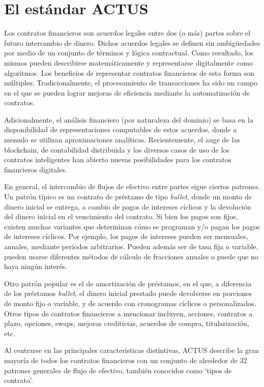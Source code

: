 \documentclass[12pt]{book}
\begin{document}
\section{El estándar ACTUS}
Los contratos financieros son acuerdos legales entre dos (o más) partes sobre el futuro intercambio de dinero. Dichos acuerdos legales se definen sin ambigüedades por medio de un conjunto de términos y lógica contractual. Como resultado, los mismos pueden describirse matemáticamente y representarse digitalmente como algoritmos. Los beneficios de representar contratos financieros de esta forma son múltiples; Tradicionalmente, el procesamiento de transacciones ha sido un campo en el que se pueden lograr mejoras de eficiencia mediante la automatización de contratos.

Adicionalmente, el análisis financiero (por naturaleza del dominio) se basa en la disponibilidad de representaciones computables de estos acuerdos, donde a menudo se utilizan aproximaciones analíticas. Recientemente, el auge de las blockchain, de contabilidad distribuida y los diversos casos de uso de los contratos inteligentes han abierto nuevas posibilidades para los contratos financieros digitales.

En general, el intercambio de flujos de efectivo entre partes sigue ciertos patrones. Un patrón típico es un contrato de préstamo de tipo \textit{bullet}, donde un monto de dinero inicial se entrega, a cambio de pagos de intereses cíclicos y la devolución del dinero inicial en el vencimiento del contrato. Si bien los pagos son fijos, existen muchas variantes que determinan cómo se programan y/o pagan los pagos de intereses cíclicos. Por ejemplo, los pagos de intereses pueden ser mensuales, anuales, mediante períodos arbitrarios. Pueden además ser de tasa fija o variable, pueden usarse diferentes métodos de cálculo de fracciones anuales o puede que no haya ningún interés.

Otro patrón popular es el de amortización de préstamos, en el que, a diferencia de los préstamos \textit{bullet}, el dinero inicial prestado puede devolverse en porciones de monto fijo o variable, y de acuerdo con cronogramas cíclicos o personalizados. Otros tipos de contratos financieros a mencionar incluyen, acciones, contratos a plazo, opciones, swaps, mejoras crediticias, acuerdos de compra, titularización, etc.

Al centrarse en las principales características distintivas, ACTUS describe la gran mayoría de todos los contratos financieros con un conjunto de alrededor de 32 patrones generales de flujo de efectivo, también conocidos como `tipos de contrato'.
\end{document}
